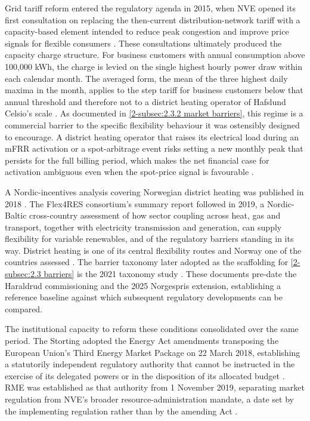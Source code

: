 Grid tariff reform entered the regulatory agenda in 2015, when NVE opened its first consultation on replacing the then-current distribution-network tariff with a capacity-based element intended to reduce peak congestion and improve price signals for flexible consumers \cite{andersen_horing_2015}. These consultations ultimately produced the capacity charge structure. For business customers with annual consumption above 100{,}000 kWh, the charge is levied on the single highest hourly power draw within each calendar month. The averaged form, the mean of the three highest daily maxima in the month, applies to the step tariff for business customers below that annual threshold and therefore not to a district heating operator of Hafslund Celsio's scale \cite{elvia_dagens_2022}. As documented in \autoref{2-subsec:2.3.2 market barriers}, this regime is a commercial barrier to the specific flexibility behaviour it was ostensibly designed to encourage. A district heating operator that raises its electrical load during an mFRR activation or a spot-arbitrage event risks setting a new monthly peak that persists for the full billing period, which makes the net financial case for activation ambiguous even when the spot-price signal is favourable \cite{kirkerud_impacts_2016}.

A Nordic-incentives analysis covering Norwegian district heating was published in 2018 \cite{sneum_economic_2018}. The Flex4RES consortium's summary report followed in 2019, a Nordic-Baltic cross-country assessment of how sector coupling across heat, gas and transport, together with electricity transmission and generation, can supply flexibility for variable renewables, and of the regulatory barriers standing in its way. District heating is one of its central flexibility routes and Norway one of the countries assessed \cite{skytte_flexible_2019}. The barrier taxonomy later adopted as the scaffolding for \autoref{2-subsec:2.3 barriers} is the 2021 taxonomy study \cite{sneum_barriers_2021}. These documents pre-date the Haraldrud commissioning and the 2025 Norgespris extension, establishing a reference baseline against which subsequent regulatory developments can be compared.

The institutional capacity to reform these conditions consolidated over the same period. The Storting adopted the Energy Act amendments transposing the European Union's Third Energy Market Package on 22 March 2018, establishing a statutorily independent regulatory authority that cannot be instructed in the exercise of its delegated powers or in the disposition of its allocated budget \cite{stortinget_vedtak_2019}. RME was established as that authority from 1 November 2019, separating market regulation from NVE's broader resource-administration mandate, a date set by the implementing regulation rather than by the amending Act \cite{energidepartementet_forskrift_2019}.

